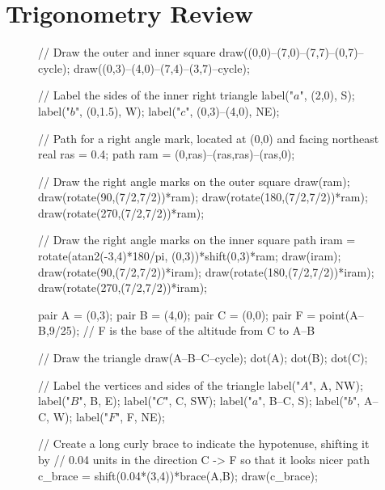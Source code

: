 \documentclass[../textbook.tex]{subfiles}
\begin{document}
\section{Trigonometry Review}

\begin{figure}[h]
	\begin{center}
		\begin{minipage}[b]{0.45\textwidth}
			\centering
			\begin{asy}[width=0.5\textwidth]
				// Draw the outer and inner square
				draw((0,0)--(7,0)--(7,7)--(0,7)--cycle);
				draw((0,3)--(4,0)--(7,4)--(3,7)--cycle);

				// Label the sides of the inner right triangle
				label("$a$", (2,0), S);
				label("$b$", (0,1.5), W);
				label("$c$", (0,3)--(4,0), NE);

				// Path for a right angle mark, located at (0,0) and facing northeast
				real ras = 0.4;
				path ram = (0,ras)--(ras,ras)--(ras,0);

				// Draw the right angle marks on the outer square
				draw(ram);
				draw(rotate(90,(7/2,7/2))*ram);
				draw(rotate(180,(7/2,7/2))*ram);
				draw(rotate(270,(7/2,7/2))*ram);

				// Draw the right angle marks on the inner square
				path iram = rotate(atan2(-3,4)*180/pi, (0,3))*shift(0,3)*ram;
				draw(iram);
				draw(rotate(90,(7/2,7/2))*iram);
				draw(rotate(180,(7/2,7/2))*iram);
				draw(rotate(270,(7/2,7/2))*iram);
			\end{asy}
		\end{minipage}
		\hfill
		\begin{minipage}[b]{0.45\textwidth}
			\centering
			\begin{asy}[width=0.7\textwidth]
				pair A = (0,3);
				pair B = (4,0);
				pair C = (0,0);
				pair F = point(A--B,9/25); // F is the base of the altitude from C to A--B

				// Draw the triangle
				draw(A--B--C--cycle);
				dot(A);
				dot(B);
				dot(C);

				// Label the vertices and sides of the triangle
				label("$A$", A, NW);
				label("$B$", B, E);
				label("$C$", C, SW);
				label("$a$", B--C, S);
				label("$b$", A--C, W);
				label("$F$", F, NE);

				// Create a long curly brace to indicate the hypotenuse, shifting it by
				// 0.04 units in the direction C -> F so that it looks nicer
				path c_brace = shift(0.04*(3,4))*brace(A,B);
				draw(c_brace);


\end{asy}
\end{minipage}
\end{center}
\end{figure}
\end{document}

